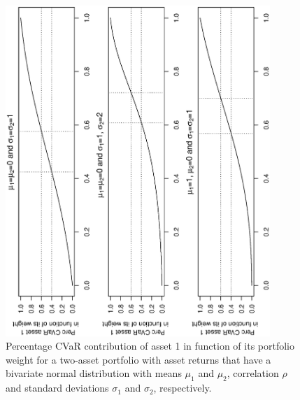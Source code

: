 \documentclass[12pt,a4paper]{article}
\begin{document}
\begin{figure}[tb] \label{fig:sensitivityfixedrho}
\begin{center}
\caption{Percentage CVaR contribution of asset 1 in function of its portfolio weight for a two-asset portfolio with asset returns that have a bivariate normal distribution with means $\mu_1$ and $\mu_2$, correlation $\rho$ and standard deviations $\sigma_1$ and $\sigma_2$, respectively.   }
\includegraphics[width=10cm,angle=270]{sensitivity_rho50.eps}
\end{center}
\end{figure}
\end{document}
